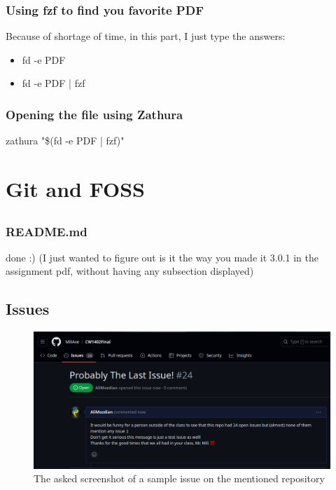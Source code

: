 \documentclass{article}
\begin{document}
	\subsubsection{Using fzf to find you favorite PDF}
	Because of shortage of time, in this part, I just type the answers:
	\begin{itemize}
		
		\item fd -e PDF

		\item fd -e PDF | fzf

	\end{itemize}

	\subsubsection{Opening the file using Zathura}
	zathura "\$(fd -e PDF | fzf)"


	\section{Git and FOSS}
	\subsection*{}
	\subsubsection{README.md}
	done :) (I just wanted to figure out is it the way you made it 3.0.1 in the assignment pdf, without having any subsection displayed)

	\subsection{Issues}

	\begin{figure}[H]
		\centering
		\includegraphics[width=\textwidth]{images/ss8.png}
		\caption{The asked screenshot of a sample issue on the mentioned repository}
	\end{figure}
	
\end{document}
